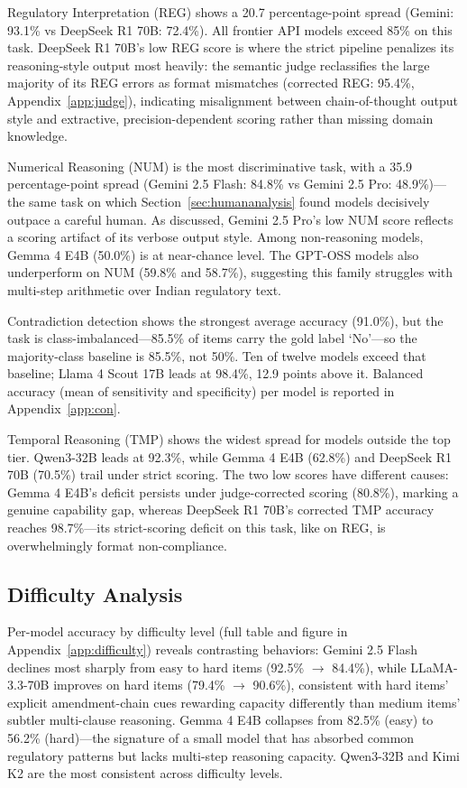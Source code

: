 \documentclass[11pt]{article}
\begin{document}
Regulatory Interpretation (REG) shows a 20.7 percentage-point spread (Gemini: 93.1\% vs DeepSeek R1 70B: 72.4\%). All frontier API models exceed 85\% on this task. DeepSeek R1 70B's low REG score is where the strict pipeline penalizes its reasoning-style output most heavily: the semantic judge reclassifies the large majority of its REG errors as format mismatches (corrected REG: 95.4\%, Appendix~\ref{app:judge}), indicating misalignment between chain-of-thought output style and extractive, precision-dependent scoring rather than missing domain knowledge.

Numerical Reasoning (NUM) is the most discriminative task, with a 35.9 percentage-point spread (Gemini 2.5 Flash: 84.8\% vs Gemini 2.5 Pro: 48.9\%)---the same task on which Section~\ref{sec:humananalysis} found models decisively outpace a careful human. As discussed, Gemini 2.5 Pro's low NUM score reflects a scoring artifact of its verbose output style. Among non-reasoning models, Gemma 4 E4B (50.0\%) is at near-chance level. The GPT-OSS models also underperform on NUM (59.8\% and 58.7\%), suggesting this family struggles with multi-step arithmetic over Indian regulatory text.

Contradiction detection shows the strongest average accuracy (91.0\%), but the task is class-imbalanced---85.5\% of items carry the gold label `No'---so the majority-class baseline is 85.5\%, not 50\%. Ten of twelve models exceed that baseline; Llama 4 Scout 17B leads at 98.4\%, 12.9 points above it. Balanced accuracy (mean of sensitivity and specificity) per model is reported in Appendix~\ref{app:con}.

Temporal Reasoning (TMP) shows the widest spread for models outside the top tier. Qwen3-32B leads at 92.3\%, while Gemma 4 E4B (62.8\%) and DeepSeek R1 70B (70.5\%) trail under strict scoring. The two low scores have different causes: Gemma 4 E4B's deficit persists under judge-corrected scoring (80.8\%), marking a genuine capability gap, whereas DeepSeek R1 70B's corrected TMP accuracy reaches 98.7\%---its strict-scoring deficit on this task, like on REG, is overwhelmingly format non-compliance.

\subsection{Difficulty Analysis}

Per-model accuracy by difficulty level (full table and figure in Appendix~\ref{app:difficulty}) reveals contrasting behaviors: Gemini 2.5 Flash declines most sharply from easy to hard items (92.5\% $\rightarrow$ 84.4\%), while LLaMA-3.3-70B improves on hard items (79.4\% $\rightarrow$ 90.6\%), consistent with hard items' explicit amendment-chain cues rewarding capacity differently than medium items' subtler multi-clause reasoning. Gemma 4 E4B collapses from 82.5\% (easy) to 56.2\% (hard)---the signature of a small model that has absorbed common regulatory patterns but lacks multi-step reasoning capacity. Qwen3-32B and Kimi K2 are the most consistent across difficulty levels.
\end{document}
